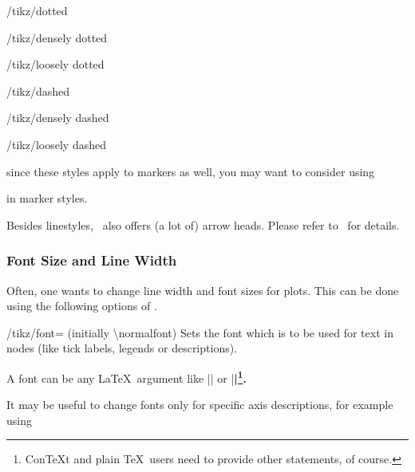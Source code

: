 \begin{stylekey}{/tikz/dotted}
\end{stylekey}

\begin{stylekey}{/tikz/densely dotted}
\end{stylekey}

\begin{stylekey}{/tikz/loosely dotted}
\end{stylekey}

\begin{stylekey}{/tikz/dashed}
\end{stylekey}

\begin{stylekey}{/tikz/densely dashed}
\end{stylekey}

\begin{stylekey}{/tikz/loosely dashed}
\end{stylekey}
\noindent since these styles apply to markers as well, you may want to consider using 
\begin{codeexample}
\end{codeexample}
\noindent in marker styles.

Besides linestyles, \PGF\ also offers (a lot of) arrow heads. Please refer to~\cite{tikz} for details.
\endgroup


\subsubsection{Font Size and Line Width}
Often, one wants to change line width and font sizes for plots. This can be done using the following options of \Tikz.

\begin{key}{/tikz/font= (initially \textbackslash normalfont)}
	Sets the font which is to be used for text in nodes (like tick labels, legends or descriptions).

	A font can be any \LaTeX\ argument like |\footnotesize| or |\small\bfseries|\footnote{Con\TeX t and plain \TeX\ users need to provide other statements, of course.}.

	It may be useful to change fonts only for specific axis descriptions, for example using
\begin{codeexample}
\end{codeexample}
\end{key}


